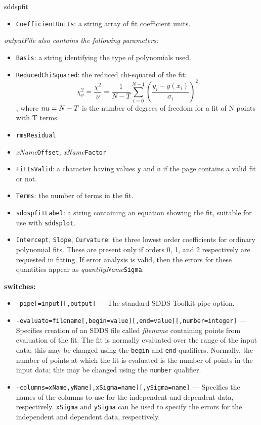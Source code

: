 \begin{sddsprog}{sddspfit}
\begin{itemize}
      \item \verb|CoefficientUnits|: a string array of fit coefficient units.
    \end{itemize}
    \emph{outputFile also contains the following parameters:}
    \begin{itemize}
      \item \verb|Basis|: a string identifying the type of polynomials used.
      \item \verb|ReducedChiSquared|: the reduced chi-squared of the fit:
      $$ \chi^2_\nu = \frac{\chi^2}{\nu} = \frac{1}{N-T}\sum_{i=0}^{N-1} \left(\frac{y_i - y(x_i)}{\sigma_i}\right)^2 $$,
      where $\\nu = N-T$ is the number of degrees of freedom for a fit of N points with T terms.
      \item \verb|rmsResidual|
      \item \emph{xName}\verb|Offset|, \emph{xName}\verb|Factor|
      \item \verb|FitIsValid|: a character having values \verb|y| and \verb|n| if the page contains a valid fit or not.
      \item \verb|Terms|: the number of terms in the fit.
      \item \verb|sddspfitLabel|: a string containing an equation showing the fit, suitable for use with \verb|sddsplot|.
      \item \verb|Intercept|, \verb|Slope|, \verb|Curvature|: the three lowest order coefficients for ordinary polynomial fits. These are present only if orders 0, 1, and 2 respectively are requested in fitting. If error analysis is valid, then the errors for these quantities appear as \emph{quantityName}\verb|Sigma|.
    \end{itemize}
  \item \textbf{switches:}
    \begin{itemize}
      \item \verb|-pipe[=input][,output]| --- The standard SDDS Toolkit pipe option.
      \item \verb|-evaluate=filename[,begin=value][,end=value][,number=integer]| --- Specifies creation of an SDDS file called \emph{filename} containing points from evaluation of the fit. The fit is normally evaluated over the range of the input data; this may be changed using the \verb|begin| and \verb|end| qualifiers. Normally, the number of points at which the fit is evaluated is the number of points in the input data; this may be changed using the \verb|number| qualifier.
      \item \verb|-columns=xName,yName[,xSigma=name][,ySigma=name]| --- Specifies the names of the columns to use for the independent and dependent data, respectively. \verb|xSigma| and \verb|ySigma| can be used to specify the errors for the independent and dependent data, respectively.

\end{itemize}
\end{sddsprog}
